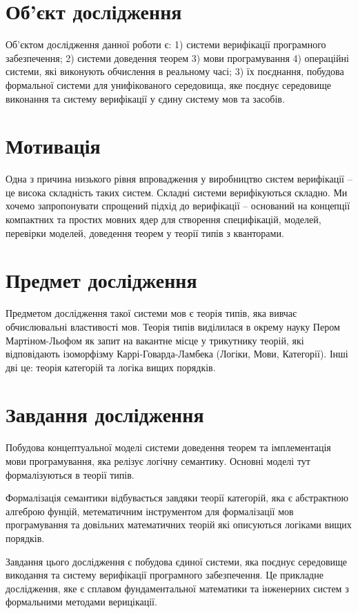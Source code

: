 \section{Об'єкт дослідження}
Об'єктом дослідження данної роботи є: 1) системи верифікації
програмного забезпечення; 2) системи доведення теорем 3) мови програмування
4) операційні системи, які виконують
обчислення в реальному часі; 3) їх поєднання, побудова формальної системи для
унифікованого середовища, яке поєднує середовище виконання та систему
верифікації у єдину систему мов та засобів.

\section{Мотивація}
Одна з причина низького рівня впровадження у виробництво систем
верифікації -- це висока складність таких систем. Складні системи
верифікуються складно. Ми хочемо запропонувати спрощений
підхід до верифікації -- оснований на концепції компактних
та простих мовних ядер для створення специфікацій, моделей,
перевірки моделей, доведення теорем у теорії типів з кванторами.

\section{Предмет дослідження}
Предметом дослідження такої системи мов є теорія типів, яка вивчає обчислювальні властивості мов.
Теорія типів виділилася в окрему науку Пером Мартіном-Льофом як запит на вакантне місце у
трикутнику теорій, які відповідають ізоморфізму Каррі-Говарда-Ламбека (Логіки, Мови, Категорії).
Інші дві це: теорія категорій та логіка вищих порядків.

\section{Завдання дослідження}
Побудова концептуальної моделі системи доведення теорем та
імплементація мови програмування,
яка релізує логічну семантику. Основні моделі тут формалізуються в теорії типів.

Формалізація семантики відбувається завдяки теорії категорій,
яка є абстрактною алгеброю фунцій, метематичним інструментом
для формалізації мов програмування та довільних
математичних теорій які описуються логіками вищих порядків.

Завдання цього дослідження є побудова єдиної системи, яка поєднує середовище
викодання та систему верифікації програмного забезпечення. Це прикладне дослідження,
яке є сплавом фундаментальної математики та інженерних систем з формальними методами верицікації.

